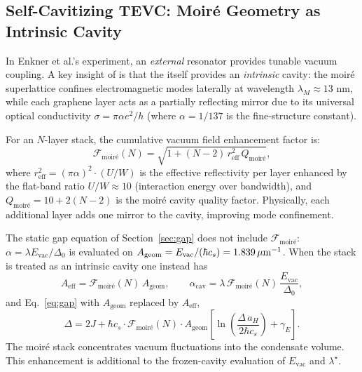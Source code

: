 \documentclass[11pt,letterpaper]{article}
\begin{document}
\subsection{Self-Cavitizing TEVC: Moiré Geometry as Intrinsic Cavity}
\label{sec:self_cavity}

In Enkner et al.'s experiment, an \textit{external} resonator provides tunable vacuum coupling. A key insight of \QVC{} is that the \TEVC{} itself provides an \textit{intrinsic} cavity: the moiré superlattice confines electromagnetic modes laterally at wavelength $\lambda_M \approx 13$ nm, while each graphene layer acts as a partially reflecting mirror due to its universal optical conductivity $\sigma = \pi\alpha e^2/h$ (where $\alpha = 1/137$ is the fine-structure constant).

For an $N$-layer stack, the cumulative vacuum field enhancement factor is:
\begin{equation}
\mathcal{F}_{\text{moir\'{e}}}(N) = \sqrt{1 + (N-2)\,r_{\text{eff}}^2 \, Q_{\text{moir\'{e}}}},
\label{eq:F_moire}
\end{equation}
where $r_{\text{eff}}^2 = (\pi\alpha)^2 \cdot (U/W)$ is the effective reflectivity per layer enhanced by the flat-band ratio $U/W \approx 10$ (interaction energy over bandwidth), and $Q_{\text{moir\'{e}}} = 10 + 2(N-2)$ is the moiré cavity quality factor. Physically, each additional layer adds one mirror to the cavity, improving mode confinement.

The static gap equation of Section~\ref{sec:gap} does not include $\mathcal{F}_{\text{moir\'{e}}}$: $\alpha=\lambda E_{\mathrm{vac}}/\Delta_0$ is evaluated on $A_{\mathrm{geom}}=E_{\mathrm{vac}}/(\hbar c_s)=1.839\,\mu\mathrm{m}^{-1}$. When the stack is treated as an intrinsic cavity one instead has
\begin{equation}
A_{\mathrm{eff}} = \mathcal{F}_{\text{moir\'{e}}}(N)\, A_{\mathrm{geom}},
\qquad
\alpha_{\mathrm{cav}} = \lambda\,\mathcal{F}_{\text{moir\'{e}}}(N)\,\frac{E_{\mathrm{vac}}}{\Delta_0},
\end{equation}
and Eq.~\eqref{eq:gap} with $A_{\mathrm{geom}}$ replaced by $A_{\mathrm{eff}}$,
\begin{equation}
\Delta = 2J + \hbar c_s \cdot \mathcal{F}_{\text{moir\'{e}}}(N) \cdot A_{\mathrm{geom}} \left[\ln\!\left(\frac{\Delta\, a_H}{2\hbar c_s}\right) + \gamma_E\right].
\label{eq:cavity_gap}
\end{equation}
The moiré stack concentrates vacuum fluctuations into the condensate volume. This enhancement is additional to the frozen-cavity evaluation of $E_{\mathrm{vac}}$ and $\lambda^\star$.
\end{document}
